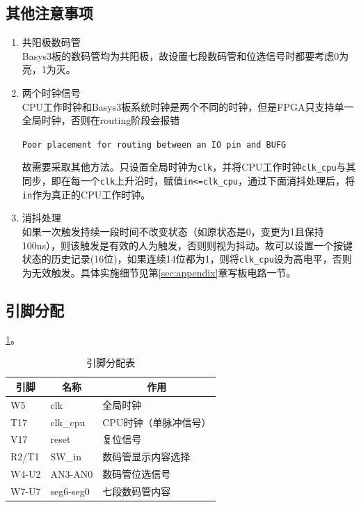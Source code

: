 \subsection{其他注意事项}
\begin{enumerate}
    \item 共阳极数码管\\
    Basys3板的数码管均为共阳极，故设置七段数码管和位选信号时都要考虑0为亮，1为灭。
    \item 两个时钟信号\\%
    CPU工作时钟和Basys3板系统时钟是两个不同的时钟，但是FPGA只支持单一全局时钟，否则在routing阶段会报错
    \begin{center}\verb'Poor placement for routing between an IO pin and BUFG'\end{center}
    故需要采取其他方法。只设置全局时钟为\verb'clk'，并将CPU工作时钟\verb'clk_cpu'与其同步，即在每一个\verb'clk'上升沿时，赋值\verb'in<=clk_cpu'，通过下面消抖处理后，将\verb'in'作为真正的CPU工作时钟。
    \item 消抖处理\\
    如果一次触发持续一段时间不改变状态（如原状态是0，变更为1且保持100ns），则该触发是有效的人为触发，否则则视为抖动。故可以设置一个按键状态的历史记录(16位)，如果连续14位都为1，则将\verb'clk_cpu'设为高电平，否则为无效触发。具体实施细节见第\ref{sec:appendix}章写板电路一节。
\end{enumerate}

\subsection{引脚分配}
\ref{tab:pin}。
\begin{table}[htbp]
  \centering\wuhao
  \caption{引脚分配表}
    \begin{tabular}{|l|l|l|}
    \hline
    \multicolumn{1}{|c|}{引脚} & \multicolumn{1}{c|}{名称} & \multicolumn{1}{c|}{作用} \bigstrut\\
    \hline
    W5    & clk   & 全局时钟 \bigstrut\\
    \hline
    T17   & clk\_cpu & CPU时钟（单脉冲信号） \bigstrut\\
    \hline
    V17   & reset & 复位信号 \bigstrut\\
    \hline
    R2/T1 & SW\_in & 数码管显示内容选择 \bigstrut\\
    \hline
    W4-U2 & AN3-AN0 & 数码管位选信号 \bigstrut\\
    \hline
    W7-U7 & seg6-seg0 & 七段数码管内容 \bigstrut\\
    \hline
    \end{tabular}%
  \label{tab:pin}%
\end{table}%

